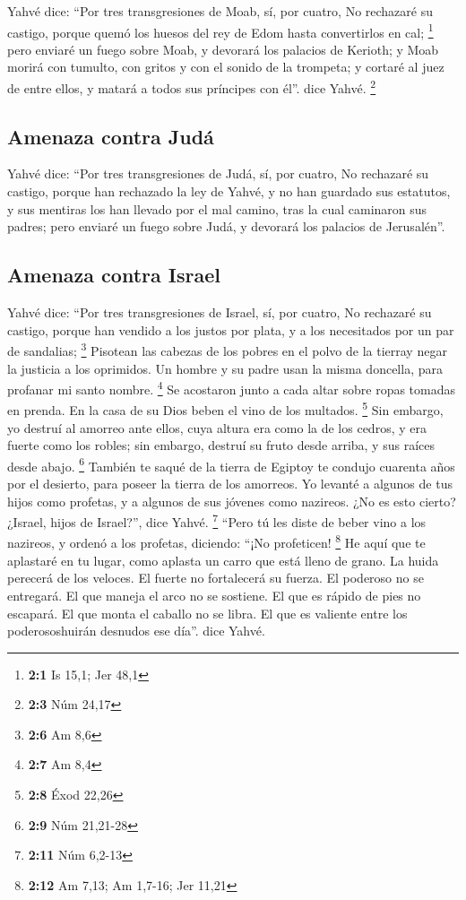  Yahvé dice: ``Por tres transgresiones de Moab, sí, por
cuatro, No rechazaré su castigo, porque quemó los huesos del rey de Edom
hasta convertirlos en cal; \footnote{\textbf{2:1} Is 15,1; Jer 48,1}
 pero enviaré un fuego sobre Moab, y devorará los palacios
de Kerioth; y Moab morirá con tumulto, con gritos y con el sonido de la
trompeta;  y cortaré al juez de entre ellos, y matará a
todos sus príncipes con él''. dice Yahvé. \footnote{\textbf{2:3} Núm
  24,17}

\hypertarget{amenaza-contra-juduxe1}{%
\subsection{Amenaza contra Judá}\label{amenaza-contra-juduxe1}}

 Yahvé dice: ``Por tres transgresiones de Judá, sí, por
cuatro, No rechazaré su castigo, porque han rechazado la ley de Yahvé, y
no han guardado sus estatutos, y sus mentiras los han llevado por el mal
camino, tras la cual caminaron sus padres;  pero enviaré
un fuego sobre Judá, y devorará los palacios de Jerusalén''.

\hypertarget{amenaza-contra-israel}{%
\subsection{Amenaza contra Israel}\label{amenaza-contra-israel}}

 Yahvé dice: ``Por tres transgresiones de Israel, sí, por
cuatro, No rechazaré su castigo, porque han vendido a los justos por
plata, y a los necesitados por un par de sandalias; \footnote{\textbf{2:6}
  Am 8,6}  Pisotean las cabezas de los pobres en el polvo
de la tierray negar la justicia a los oprimidos. Un hombre y su padre
usan la misma doncella, para profanar mi santo nombre. \footnote{\textbf{2:7}
  Am 8,4}  Se acostaron junto a cada altar sobre ropas
tomadas en prenda. En la casa de su Dios beben el vino de los multados.
\footnote{\textbf{2:8} Éxod 22,26}  Sin embargo, yo
destruí al amorreo ante ellos, cuya altura era como la de los cedros, y
era fuerte como los robles; sin embargo, destruí su fruto desde arriba,
y sus raíces desde abajo. \footnote{\textbf{2:9} Núm 21,21-28}
 También te saqué de la tierra de Egiptoy te condujo
cuarenta años por el desierto, para poseer la tierra de los amorreos.
 Yo levanté a algunos de tus hijos como profetas, y a
algunos de sus jóvenes como nazireos. ¿No es esto cierto? ¿Israel, hijos
de Israel?'', dice Yahvé. \footnote{\textbf{2:11} Núm 6,2-13}
 ``Pero tú les diste de beber vino a los nazireos, y
ordenó a los profetas, diciendo: ``¡No profeticen! \footnote{\textbf{2:12}
  Am 7,13; Am 1,7-16; Jer 11,21}  He aquí que te
aplastaré en tu lugar, como aplasta un carro que está lleno de grano.
 La huida perecerá de los veloces. El fuerte no
fortalecerá su fuerza. El poderoso no se entregará.  El
que maneja el arco no se sostiene. El que es rápido de pies no escapará.
El que monta el caballo no se libra.  El que es valiente
entre los poderososhuirán desnudos ese día''. dice Yahvé.


